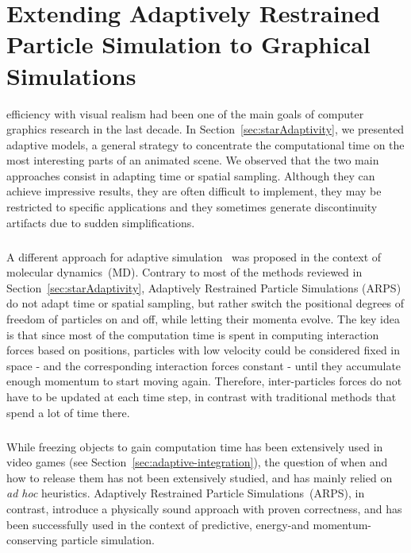 \chapter[Extending ARPS to Graphical Simulations]{Extending Adaptively Restrained Particle Simulation to Graphical Simulations}
\label{chap:arps}

 efficiency with visual realism had been one of the main goals of computer graphics research in the last decade. 
In Section~\ref{sec:starAdaptivity}, we presented adaptive models, a general strategy to concentrate the computational time on the most interesting parts of an animated scene. 
We observed that the two main approaches consist in adapting time or spatial sampling. 
Although they can achieve impressive results, they are often difficult to implement, they may be restricted to specific applications and they sometimes generate discontinuity artifacts due to sudden simplifications.
\paragraph*{}
A different approach for adaptive simulation~\cite{Artemova2012} was proposed in the context of molecular dynamics~(MD). Contrary to most of the methods reviewed in Section~\ref{sec:starAdaptivity}, Adaptively Restrained Particle Simulations (ARPS) do not adapt time or spatial sampling, but rather switch the positional degrees of freedom of particles on and off, while letting their momenta evolve. The key idea is that since most of the computation time is spent in computing interaction forces based on positions, particles with low velocity could be considered fixed in space - and the corresponding interaction forces constant - until they accumulate enough momentum to start moving again. Therefore, inter-particles forces do not have to be updated at each time step, in contrast with traditional methods that spend a lot of time there.
\paragraph*{}
While freezing objects to gain computation time has been extensively used in video games (see Section~\ref{sec:adaptive-integration}), the question of when and how to release them has not been extensively studied, and has mainly relied on \textit{ad hoc} heuristics.
Adaptively Restrained Particle Simulations~(ARPS), in contrast, introduce a physically sound approach with proven correctness, and has been successfully used in the context of predictive, energy-and momentum-conserving particle simulation.
